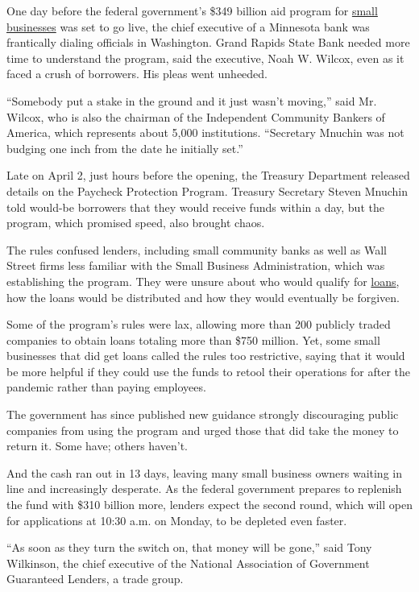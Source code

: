 One day before the federal government's \$349 billion aid program for
\href{https://www.nytimes.com/2020/05/13/business/paycheck-protection-program-small-business.html}{small
businesses} was set to go live, the chief executive of a Minnesota bank
was frantically dialing officials in Washington. Grand Rapids State Bank
needed more time to understand the program, said the executive, Noah W.
Wilcox, even as it faced a crush of borrowers. His pleas went unheeded.

``Somebody put a stake in the ground and it just wasn't moving,'' said
Mr. Wilcox, who is also the chairman of the Independent Community
Bankers of America, which represents about 5,000 institutions.
``Secretary Mnuchin was not budging one inch from the date he initially
set.''

Late on April 2, just hours before the opening, the Treasury Department
released details on the Paycheck Protection Program. Treasury Secretary
Steven Mnuchin told would-be borrowers that they would receive funds
within a day, but the program, which promised speed, also brought chaos.

The rules confused lenders, including small community banks as well as
Wall Street firms less familiar with the Small Business Administration,
which was establishing the program. They were unsure about who would
qualify for
\href{https://www.nytimes.com/2020/05/13/business/paycheck-protection-program-small-business.html}{loans},
how the loans would be distributed and how they would eventually be
forgiven.

Some of the program's rules were lax, allowing more than 200 publicly
traded companies to obtain loans totaling more than \$750 million. Yet,
some small businesses that did get loans called the rules too
restrictive, saying that it would be more helpful if they could use the
funds to retool their operations for after the pandemic rather than
paying employees.

The government has since published new guidance strongly discouraging
public companies from using the program and urged those that did take
the money to return it. Some have; others haven't.

And the cash ran out in 13 days, leaving many small business owners
waiting in line and increasingly desperate. As the federal government
prepares to replenish the fund with \$310 billion more, lenders expect
the second round, which will open for applications at 10:30 a.m. on
Monday, to be depleted even faster.

``As soon as they turn the switch on, that money will be gone,'' said
Tony Wilkinson, the chief executive of the National Association of
Government Guaranteed Lenders, a trade group.

